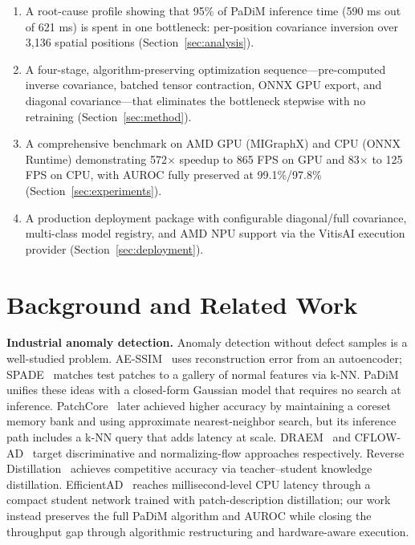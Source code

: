 \documentclass[blind]{gtac}
\begin{document}
\begin{enumerate}
  \item A root-cause profile showing that 95\% of PaDiM inference time
    (590 ms out of 621 ms) is spent in one bottleneck: per-position covariance
    inversion over 3{,}136 spatial positions
    (Section~\ref{sec:analysis}).

  \item A four-stage, algorithm-preserving optimization sequence---pre-computed
    inverse covariance, batched tensor contraction, ONNX GPU export, and
    diagonal covariance---that eliminates the bottleneck stepwise with no
    retraining
    (Section~\ref{sec:method}).

  \item A comprehensive benchmark on AMD GPU (MIGraphX) and CPU (ONNX Runtime)
    demonstrating 572$\times$ speedup to 865 FPS on GPU and 83$\times$ to
    125 FPS on CPU, with AUROC fully preserved at 99.1\%/97.8\%
    (Section~\ref{sec:experiments}).

  \item A production deployment package with configurable diagonal/full
    covariance, multi-class model registry, and AMD NPU support via the
    VitisAI execution provider (Section~\ref{sec:deployment}).
\end{enumerate}

\section{Background and Related Work}
\label{sec:background}

\textbf{Industrial anomaly detection.}
Anomaly detection without defect samples is a well-studied problem.
AE-SSIM~\cite{bergmann2019improving} uses reconstruction error from an
autoencoder; SPADE~\cite{cohen2020sub} matches test patches to a gallery of
normal features via k-NN.  PaDiM~\cite{defard2021padim} unifies these ideas
with a closed-form Gaussian model that requires no search at inference.
PatchCore~\cite{roth2022towards} later achieved higher accuracy by maintaining
a coreset memory bank and using approximate nearest-neighbor search, but its
inference path includes a k-NN query that adds latency at scale.  DRAEM~\cite{zavrtanik2021reconstruction}
and CFLOW-AD~\cite{gudovskiy2022cflow} target discriminative and normalizing-flow
approaches respectively.  Reverse Distillation~\cite{deng2022anomaly} achieves
competitive accuracy via teacher--student knowledge distillation.
EfficientAD~\cite{batzner2024efficientad} reaches millisecond-level CPU latency
through a compact student network trained with patch-description distillation;
our work instead preserves the full PaDiM algorithm and AUROC while closing the
throughput gap through algorithmic restructuring and hardware-aware execution.
\end{document}
